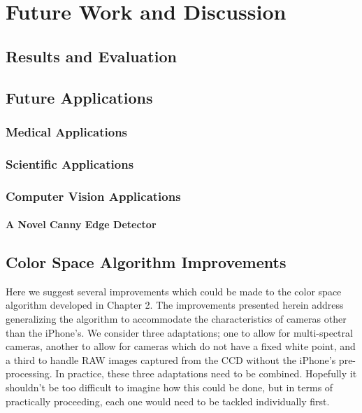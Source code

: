 
\chapter{Future Work and Discussion}

\ifpdf
    \graphicspath{{Chapter5/Figs/Raster/}{Chapter5/Figs/PDF/}{Chapter5/Figs/}}
\else
    \graphicspath{{Chapter5/Figs/Vector/}{Chapter5/Figs/}}
\fi
\section{Results and Evaluation}\label{sec:ResultsAndEvaluation}

\section{Future Applications}\label{sec:FutureApplications}


\subsection{Medical Applications}\label{sec:MedicalApplications}

\subsection{Scientific Applications}\label{sec:ScientificApplications}

\subsection{Computer Vision Applications}\label{sec:ComputerVisionApplications}

\subsubsection{A Novel Canny Edge Detector}\label{sec:ANovelCannyEdgeDetector}


\section{Color Space Algorithm Improvements}\label{sec:ColorSpaceAlgorithmImprovements}
Here we suggest several improvements which could be made to the color space algorithm developed in Chapter 2. The improvements presented herein address generalizing the algorithm to accommodate the characteristics of cameras other than the iPhone's. We consider three adaptations; one to allow for multi-spectral cameras, another to allow for cameras which do not have a fixed white point, and a third to handle RAW images captured from the CCD without the iPhone's pre-processing. In practice, these three adaptations need to be combined. Hopefully it shouldn't be too difficult to imagine how this could be done, but in terms of practically proceeding, each one would need to be tackled individually first.

